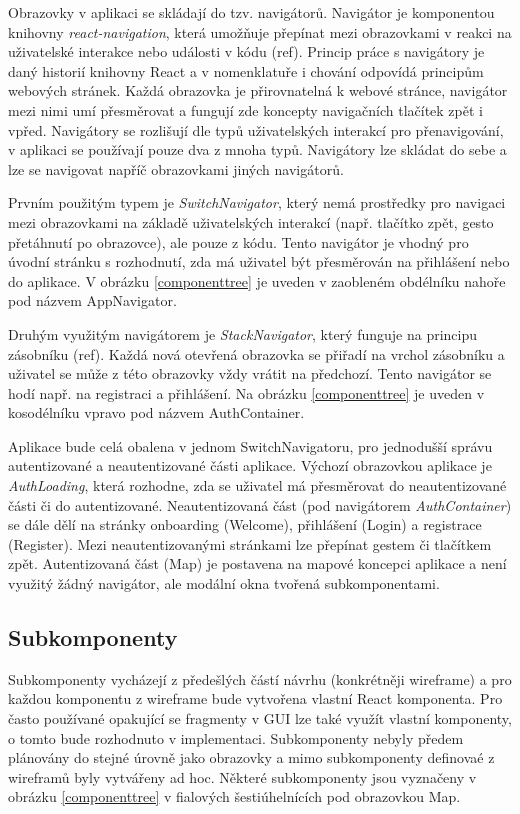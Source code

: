 Obrazovky v aplikaci se skládají do tzv. navigátorů. Navigátor je komponentou knihovny \emph{react-navigation}, která umožňuje přepínat mezi obrazovkami v reakci na uživatelské interakce nebo události v kódu (ref). Princip práce s navigátory je daný historií knihovny React  a v nomenklatuře i chování odpovídá principům webových stránek. Každá obrazovka je přirovnatelná k webové stránce, navigátor mezi nimi umí přesměrovat a fungují zde koncepty navigačních tlačítek zpět i vpřed. Navigátory se rozlišují dle typů uživatelských interakcí pro přenavigování, v aplikaci se používají pouze dva z mnoha typů. Navigátory lze skládat do sebe a lze se navigovat napříč obrazovkami jiných navigátorů.

Prvním použitým typem je \emph{SwitchNavigator}, který nemá prostředky pro navigaci mezi obrazovkami na základě uživatelských interakcí (např. tlačítko zpět, gesto přetáhnutí po obrazovce), ale pouze z kódu. Tento navigátor je vhodný pro úvodní stránku s rozhodnutí, zda má uživatel být přesměrován na přihlášení nebo do aplikace. V obrázku \ref{componenttree} je uveden v zaobleném obdélníku nahoře pod názvem AppNavigator.

Druhým využitým navigátorem je \emph{StackNavigator}, který funguje na principu zásobníku (ref). Každá nová otevřená obrazovka se přiřadí na vrchol zásobníku a uživatel se může z této obrazovky vždy vrátit na předchozí. Tento navigátor se hodí např. na registraci a přihlášení. Na obrázku \ref{componenttree} je uveden v kosodélníku vpravo pod názvem AuthContainer.

Aplikace bude celá obalena v jednom SwitchNavigatoru, pro jednodušší správu autentizované a neautentizované části aplikace. Výchozí obrazovkou aplikace je \emph{AuthLoading}, která rozhodne, zda se uživatel má přesměrovat do neautentizované části či do autentizované. Neautentizovaná část (pod navigátorem \emph{AuthContainer}) se dále dělí na stránky onboarding (Welcome), přihlášení (Login) a registrace (Register). Mezi neautentizovanými stránkami lze přepínat gestem či tlačítkem zpět. Autentizovaná část (Map) je postavena na mapové koncepci aplikace a není využitý žádný navigátor, ale modální okna tvořená subkomponentami.

\subsection{Subkomponenty}

Subkomponenty vycházejí z předešlých částí návrhu (konkrétněji wireframe) a pro každou komponentu z wireframe bude vytvořena vlastní React komponenta. Pro často používané opakující se fragmenty v GUI lze také využít vlastní komponenty, o tomto bude rozhodnuto v implementaci. Subkomponenty nebyly předem plánovány do stejné úrovně jako obrazovky a mimo subkomponenty definovaé z wireframů byly vytvářeny ad hoc. Některé subkomponenty jsou vyznačeny v obrázku \ref{componenttree} v fialových šestiúhelnících pod obrazovkou Map.
